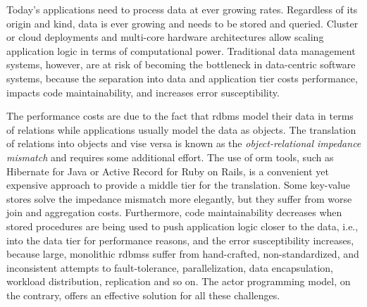 
  Today's applications need to process data at ever growing rates.
  Regardless of its origin and kind, data is ever growing and needs to be stored and queried.
  Cluster or cloud deployments and multi-core hardware architectures allow scaling application logic in terms of computational power.
  Traditional data management systems, however, are at risk of becoming the bottleneck in data-centric software systems, because the separation into data and application tier costs performance, impacts code maintainability, and increases error susceptibility.

  The performance costs are due to the fact that \gls{rdbms} model their data in terms of relations while applications usually model the data as objects.
  The translation of relations into objects and vise versa is known as the \emph{object-relational impedance mismatch} and requires some additional effort.
  The use of \gls{orm} tools, such as Hibernate for Java or Active Record for Ruby on Rails, is a convenient yet expensive approach to provide a middle tier for the translation. Some key-value stores solve the impedance mismatch more elegantly, but they suffer from worse join and aggregation costs. Furthermore, code maintainability decreases when stored procedures are being used to push application logic closer to the data, {i.e.}, into the data tier for performance reasons, and the error susceptibility increases, because large, monolithic \glspl{rdbms} suffer from hand-crafted, non-standardized, and inconsistent attempts to fault-tolerance, parallelization, data encapsulation, workload distribution, replication and so on. The actor programming model, on the contrary, offers an effective solution for all these challenges.

